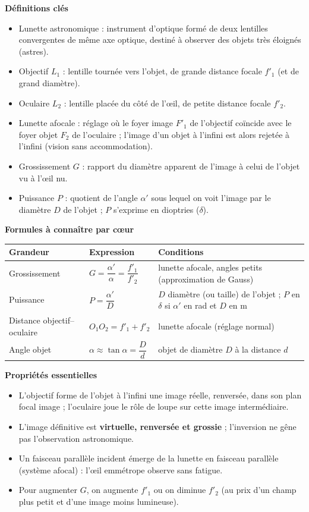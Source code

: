 \documentclass[11pt]{article}
\newcommand{\cle}[1]{{\popxbold\color{popdark}#1}}
\begin{document}
\begin{bilan}
\textbf{Définitions clés}
\begin{itemize}
  \item \cle{Lunette astronomique} : instrument d'optique formé de deux lentilles convergentes de même axe optique, destiné à observer des objets très éloignés (astres).
  \item \cle{Objectif} $L_1$ : lentille tournée vers l'objet, de grande distance focale $f'_1$ (et de grand diamètre).
  \item \cle{Oculaire} $L_2$ : lentille placée du côté de l'\oe il, de petite distance focale $f'_2$.
  \item \cle{Lunette afocale} : réglage où le foyer image $F'_1$ de l'objectif coïncide avec le foyer objet $F_2$ de l'oculaire ; l'image d'un objet à l'infini est alors rejetée à l'infini (vision sans accommodation).
  \item \cle{Grossissement} $G$ : rapport du diamètre apparent de l'image à celui de l'objet vu à l'\oe il nu.
  \item \cle{Puissance} $P$ : quotient de l'angle $\alpha'$ sous lequel on voit l'image par le diamètre $D$ de l'objet ; $P$ s'exprime en dioptries ($\delta$).
\end{itemize}

\textbf{Formules à connaître par c\oe ur}
\begin{center}
\begin{tabularx}{\linewidth}{|l|X|X|}\hline
\rowcolor{popblueL}
\textbf{Grandeur} & \textbf{Expression} & \textbf{Conditions} \\ \hline
Grossissement & $G=\dfrac{\alpha'}{\alpha}=\dfrac{f'_1}{f'_2}$ & lunette afocale, angles petits (approximation de Gauss) \\ \hline
Puissance & $P=\dfrac{\alpha'}{D}$ & $D$ diamètre (ou taille) de l'objet ; $P$ en $\delta$ si $\alpha'$ en rad et $D$ en m \\ \hline
Distance objectif--oculaire & $O_1O_2 = f'_1 + f'_2$ & lunette afocale (réglage normal) \\ \hline
Angle objet & $\alpha \approx \tan\alpha = \dfrac{D}{d}$ & objet de diamètre $D$ à la distance $d$ \\ \hline
\end{tabularx}
\end{center}

\textbf{Propriétés essentielles}
\begin{itemize}
  \item L'objectif forme de l'objet à l'infini une image réelle, renversée, dans son plan focal image ; l'oculaire joue le rôle de loupe sur cette image intermédiaire.
  \item L'image définitive est \textbf{virtuelle, renversée et grossie} ; l'inversion ne gêne pas l'observation astronomique.
  \item Un faisceau parallèle incident émerge de la lunette en faisceau parallèle (système afocal) : l'\oe il emmétrope observe sans fatigue.
  \item Pour augmenter $G$, on augmente $f'_1$ ou on diminue $f'_2$ (au prix d'un champ plus petit et d'une image moins lumineuse).
\end{itemize}


\end{bilan}
\end{document}
